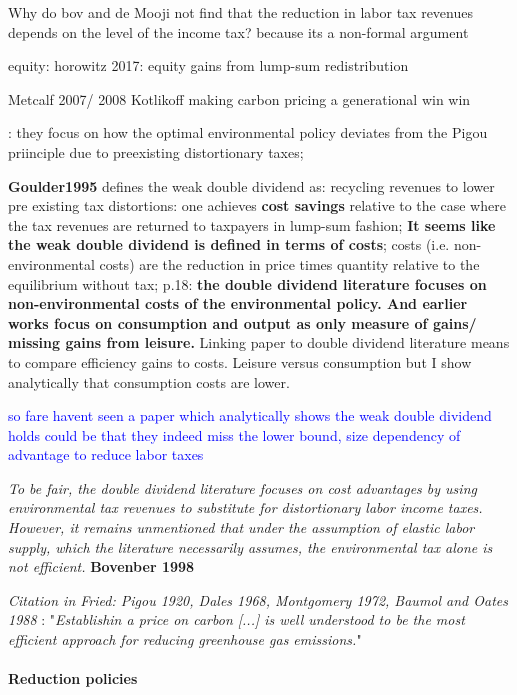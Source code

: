 
Why do bov and de Mooji not find that the reduction in labor tax revenues depends on the level of the income tax? \ar because its a non-formal argument

equity: horowitz 2017: equity gains from lump-sum redistribution

Metcalf 2007/ 2008
Kotlikoff making carbon pricing a generational win win

\cite{LansBovenberg1996OptimalAnalyses}: they focus on how the optimal environmental policy deviates from the Pigou priinciple due to preexisting distortionary taxes; 

\textbf{Goulder1995} defines the weak double dividend as: recycling revenues to lower pre existing tax distortions: one achieves \textbf{cost savings} relative to the case where the tax revenues are returned to taxpayers in lump-sum fashion; 
\textbf{It seems like the weak double dividend is defined in terms of costs}; costs (i.e. non-environmental costs) are the reduction in price times quantity relative to the equilibrium without tax; p.18: \textbf{the double dividend literature focuses on non-environmental costs of the environmental policy. And earlier works focus on consumption and output as only measure of gains/ missing gains from leisure. } 
Linking paper to double dividend literature means to compare efficiency gains to costs. Leisure versus consumption \ar but I show analytically that consumption costs are lower. 

\textcolor{blue}{so fare havent seen a paper which analytically shows the weak double dividend holds \ar could be that they indeed miss the lower bound, size dependency of advantage to reduce labor taxes}

\textit{To be fair, the double dividend literature focuses on cost advantages by using environmental tax revenues to substitute for distortionary labor income taxes. However, it remains unmentioned that under the assumption of elastic labor supply, which the literature necessarily assumes, the environmental tax alone is not efficient. }
\textbf{Bovenber 1998}



\textit{Citation in Fried: Pigou 1920, Dales 1968, Montgomery 1972, Baumol and Oates 1988 }: "\textit{Establishin a price on carbon [...] is well understood to be the most efficient approach for reducing greenhouse gas emissions.}"

\paragraph{Reduction policies}